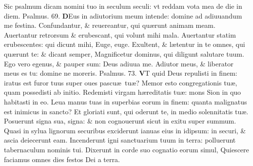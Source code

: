 \documentclass[a5paper,10pt]{book}
\def\ae{æ}
\begin{document}
\begin{multicols*}{2}
\newline \color{red} S\color{black}ic psalmum dicam nomini tuo in seculum seculi: vt reddam vota mea de die in diem. \quad \color{red} Psalmus. 69. \color{black}
\vspace{-.5em}
\lettrine[lines=2]{\bfseries \color{red} D}{}Eus in adiutorium meum intende: domine ad adiuuandum me festina.
\newline \color{red} C\color{black}onfundantur, \& reuereantur, qui qu\ae runt animam meam.
\newline \color{red} A\color{black}uertantur retrorsum \& erubescant, qui volunt mihi mala.
\newline \color{red} A\color{black}uertantur statim erubescentes: qui dicunt mihi, Euge, euge.
\newline \color{red} E\color{black}xultent, \& l\ae tentur in te omnes, qui qu\ae runt te: \& dicant semper, Magnificetur dominus, qui diligunt salutare tuum.
\newline \color{red} E\color{black}go vero egenus, \& pauper sum: Deus adiuua me.
\newline \color{red} A\color{black}diutor meus, \& liberator meus es tu: domine ne moreris. \quad \color{red} Psalmus. 73. \color{black}
\vspace{-.5em}
\lettrine[lines=2]{\bfseries \color{red} V}{}T quid Deus repulisti in finem: iratus est furor tuus super oues pascu\ae \ tu\ae ?
\newline \color{red} M\color{black}emor esto congregationis tu\ae , quam possedisti ab initio.
\newline \color{red} R\color{black}edemisti virgam h\ae reditatis tu\ae : mons Sion in quo habitasti in eo.
\newline \color{red} L\color{black}eua manus tuas in superbias eorum in finem: quanta malignatus est inimicus in sancto?
\newline \color{red} E\color{black}t gloriati sunt, qui oderunt te, in medio solennitatis tu\ae .
\newline \color{red} P\color{black}osuerunt signa sua, signa: \& non cognouerunt sicut in exitu super summum.
\newline \color{red} Q\color{black}uasi in sylua lignorum securibus exciderunt ianuas eius in idipsum: in securi, \& ascia deiecerunt eam.
\newline \color{red} I\color{black}ncenderunt igni sanctuarium tuum in terra: polluerunt tabernaculum nominis tui.
\newline \color{red} D\color{black}ixerunt in corde suo cognatio eorum simul, Quiescere faciamus omnes dies festos Dei a terra.

\end{multicols*}
\end{document}
